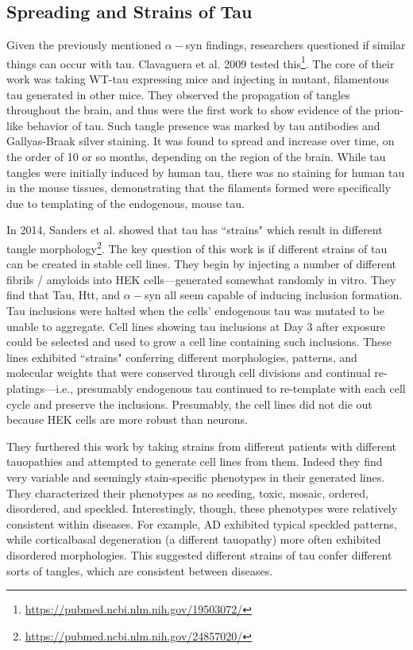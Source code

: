\subsection*{Spreading and Strains of Tau}

Given the previously mentioned $\alpha-$syn findings, researchers questioned if similar things can occur with tau. Clavaguera et al. 2009 tested this\footnote{\url{https://pubmed.ncbi.nlm.nih.gov/19503072/}}. The core of their work was taking WT-tau expressing mice and injecting in mutant, filamentous tau generated in other mice. They observed the propagation of tangles throughout the brain, and thus were the first work to show evidence of the prion-like behavior of tau. Such tangle presence was marked by tau antibodies and Gallyas-Braak silver staining. It was found to spread and increase over time, on the order of 10 or so months, depending on the region of the brain. While tau tangles were initially induced by human tau, there was no staining for human tau in the mouse tissues, demonstrating that the filaments formed were specifically due to templating of the endogenous, mouse tau.\newline


In 2014, Sanders et al. showed that tau has ``strains" which result in different tangle morphology\footnote{\url{https://pubmed.ncbi.nlm.nih.gov/24857020/}}. The key question of this work is if different strains of tau can be created in stable cell lines. They begin by injecting a number of different fibrils / amyloids into HEK cells---generated somewhat randomly in vitro. They find that Tau, Htt, and $\alpha-$syn all seem capable of inducing inclusion formation. Tau inclusions were halted when the cells' endogenous tau was mutated to be unable to aggregate. Cell lines showing tau inclusions at Day 3 after exposure could be selected and used to grow a cell line containing such inclusions. These lines exhibited ``strains" conferring different morphologies,  patterns, and molecular weights that were conserved through cell divisions and continual re-platings---i.e., presumably endogenous tau continued to re-template with each cell cycle and preserve the inclusions. Presumably, the cell lines did not die out because HEK cells are more robust than neurons.\newline

They furthered this work by taking strains from different patients with different tauopathies and attempted to generate cell lines from them. Indeed they find very variable and seemingly stain-specific phenotypes in their generated lines. They characterized their phenotypes as no seeding, toxic, mosaic, ordered, disordered, and speckled. Interestingly, though, these phenotypes were relatively consistent within diseases. For example, AD exhibited typical speckled patterns, while corticalbasal degeneration (a different tauopathy) more often exhibited disordered morphologies. This suggested different strains of tau confer different sorts of tangles, which are consistent between diseases.

